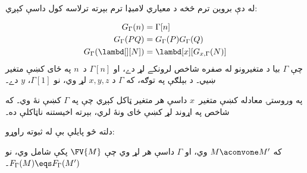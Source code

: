 \documentclass[../../../include/open-logic-section]{subfiles}
\begin{document}
له دې بروين ترم څخه د معياري لامبډا ترم بېرته ترلاسه کول داسې
کېږي:

\begin{defn}
  \begin{align*}
    G_\Gamma(n) &= \Gamma[n] \\
    G_\Gamma(PQ) &= G_\Gamma(P) G_\Gamma(Q) \\
    G_\Gamma(\lambd[][N]) &= \lambd[x][G_{x,\Gamma}(N)]
  \end{align*}
  چې $\Gamma$ بيا د متغيرونو له صفره شاخص لرونکے لړ دے، او
  $\Gamma[n]$ د~$n$ په ځای کښې متغير ښيي۔ د بېلګې په توګه،
  که $\Gamma$ د $x,y,z$ لړ وي، نو $\Gamma[1]$، $y$ دے۔

  په وروستۍ معادله کښې متغير~$x$ داسې هر متغير ټاکل کېږي چې
  په $\Gamma$ کښې نۀ وي۔
  که شاخص په اړوند لړ کښې ځای ونۀ لري، بېرته اخيستنه ناټاکلې ده۔
\end{defn}

دلته څو پايلې بې له ثبوته راوړو:

\begin{prop}
  که $M \aconvone M'$ وي، او $\Gamma$ داسې هر لړ وي چې
  $\FV{M}$ پکې شامل وي، نو $F_\Gamma(M) \eqs F_\Gamma(M')$۔
\end{prop}
\end{document}

